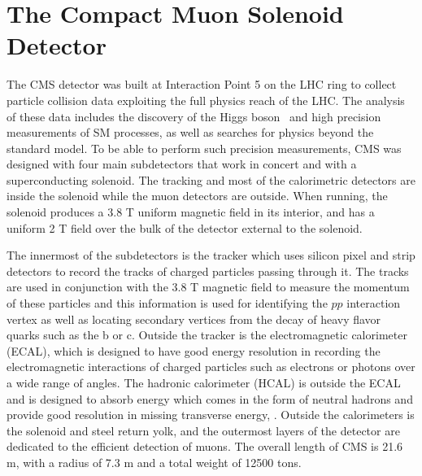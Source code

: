 \section{The Compact Muon Solenoid Detector}

The CMS detector was built
 at Interaction Point 5 on the LHC ring
 to collect particle collision data  exploiting the full physics reach
 of the LHC.
The analysis of these data includes
 the discovery of the Higgs boson~\cite{Chatrchyan:2012ufa,Aad:2012tfa}
 and high precision measurements of SM processes,
 as well as searches for physics beyond the standard model.
To be able to perform such precision measurements,
 CMS was designed with four main subdetectors 
 that work in concert and with a superconducting solenoid.
The tracking and most of the calorimetric
 detectors are inside the solenoid while
 the muon detectors are outside.
When running, the solenoid produces a 3.8 T 
 uniform magnetic field in its interior,
 and has a uniform 2 T field 
 over the bulk of the detector external to the solenoid.

The innermost of the subdetectors is the tracker
 which uses silicon pixel and strip detectors 
 to record the tracks of charged particles 
 passing through it. 
The tracks are used in conjunction with the
 $3.8$ T magnetic field to measure the momentum of these particles
 and
 this information is used for identifying
 the $pp$ interaction vertex %
 as well as locating secondary vertices 
 from the decay of heavy flavor quarks
 such as the b or c.
Outside the tracker is the electromagnetic calorimeter (ECAL), 
 which is designed to have good energy resolution in recording
 the electromagnetic interactions of charged particles
 such as electrons or photons over a wide range of angles.
The hadronic calorimeter (HCAL) is outside the ECAL
 and is designed to absorb energy which
 comes in the form of neutral hadrons and provide 
 good resolution in missing transverse energy, \met.
Outside the calorimeters is the solenoid and steel return yolk,
 and the outermost layers of the detector are dedicated
 to the efficient detection of muons.
The overall length of CMS is 21.6 m, with a radius of 7.3 m
  and a total weight of 12500 tons.

